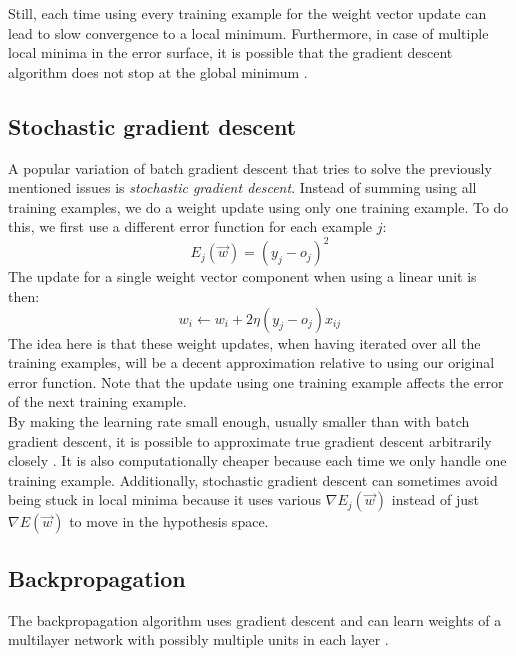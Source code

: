 Still, each time using every training example for the weight vector update can lead to slow convergence to a local minimum. Furthermore, in case of multiple local minima in the error surface, it is possible that the gradient descent algorithm does not stop at the global minimum \parencite{ML}.

\subsection{Stochastic gradient descent} %
\label{ssub:stochastic_gradient_descent}
A popular variation of batch gradient descent that tries to solve the previously mentioned issues is \textit{stochastic gradient descent}. Instead of summing using all training examples, we do a weight update using only one training example. To do this, we first use a different error function for each example $j$:
\begin{equation}
    E_j(\overrightarrow{w}) = (y_j - o_j)^2
\end{equation}
The update for a single weight vector component when using a linear unit is then:
\begin{equation}
    w_i \gets w_i + 2 \eta(y_j- o_j)x_{ij}
\end{equation}
The idea here is that these weight updates, when having iterated over all the training examples, will be a decent approximation relative to using our original error function. Note that the update using one training example affects the error of the next training example.\\

By making the learning rate small enough, usually smaller than with batch gradient descent, it is possible to approximate true gradient descent arbitrarily closely \parencite{ML}.
It is also computationally cheaper because each time we only handle one training example.
Additionally, stochastic gradient descent can sometimes avoid being stuck in local minima because it uses various $\nabla E_j(\overrightarrow{w})$ instead of just $\nabla E(\overrightarrow{w})$ to move in the hypothesis space.

\subsection{Backpropagation} %
\label{ssub:backpropagation}
The backpropagation algorithm uses gradient descent and can learn weights of a multilayer network with possibly multiple units in each layer \parencite{rumelhart1986learning}.


